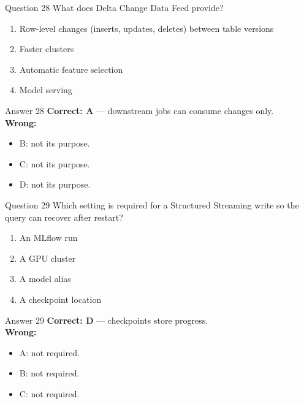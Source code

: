 \documentclass[aspectratio=169,11pt]{beamer}
\begin{document}
\begin{frame}{Question 28}
What does Delta Change Data Feed provide?
\begin{enumerate}[label=\Alph*.]
\item Row-level changes (inserts, updates, deletes) between table versions
\item Faster clusters
\item Automatic feature selection
\item Model serving
\end{enumerate}
\end{frame}
\begin{frame}{Answer 28}
\textbf{Correct: A} --- downstream jobs can consume changes only.\\
\vspace{0.5em}
\textbf{Wrong:}
\begin{itemize}
\item B: not its purpose.
\item C: not its purpose.
\item D: not its purpose.
\end{itemize}
\end{frame}

\begin{frame}{Question 29}
Which setting is required for a Structured Streaming write so the query can recover after restart?
\begin{enumerate}[label=\Alph*.]
\item An MLflow run
\item A GPU cluster
\item A model alias
\item A checkpoint location
\end{enumerate}
\end{frame}
\begin{frame}{Answer 29}
\textbf{Correct: D} --- checkpoints store progress.\\
\vspace{0.5em}
\textbf{Wrong:}
\begin{itemize}
\item A: not required.
\item B: not required.
\item C: not required.
\end{itemize}
\end{frame}
\end{document}
